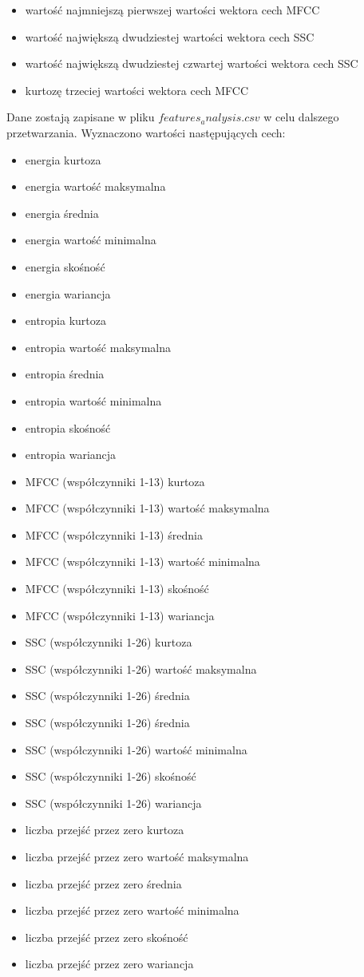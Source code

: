 \documentclass[a4paper,12pt,twoside,openany]{report}
\begin{document}
\begin{itemize}
\item wartość najmniejszą pierwszej wartości wektora cech MFCC
\item wartość największą dwudziestej wartości wektora cech SSC
\item wartość największą dwudziestej czwartej wartości wektora cech SSC
\item kurtozę trzeciej wartości wektora cech MFCC
\end{itemize}
Dane zostają zapisane w pliku $features_analysis.csv$ w celu dalszego przetwarzania.
Wyznaczono wartości następujących cech:
\begin{itemize}
\item energia kurtoza
\item energia wartość maksymalna
\item energia średnia
\item energia wartość minimalna
\item energia skośność
\item energia wariancja
\item entropia kurtoza
\item entropia wartość maksymalna
\item entropia średnia
\item entropia wartość minimalna
\item entropia skośność
\item entropia wariancja
\item MFCC (współczynniki 1-13)  kurtoza
\item MFCC (współczynniki 1-13)  wartość maksymalna
\item MFCC (współczynniki 1-13)  średnia
\item MFCC (współczynniki 1-13)  wartość minimalna
\item MFCC (współczynniki 1-13)  skośność
\item MFCC (współczynniki 1-13)  wariancja
\item SSC (współczynniki 1-26)  kurtoza
\item SSC (współczynniki 1-26)  wartość maksymalna
\item SSC (współczynniki 1-26)  średnia
\item SSC (współczynniki 1-26)  średnia
\item SSC (współczynniki 1-26)  wartość minimalna
\item SSC (współczynniki 1-26)  skośność
\item SSC (współczynniki 1-26)  wariancja
\item liczba przejść przez zero kurtoza
\item liczba przejść przez zero wartość maksymalna
\item liczba przejść przez zero średnia
\item liczba przejść przez zero wartość minimalna
\item liczba przejść przez zero skośność
\item liczba przejść przez zero wariancja
\end{itemize}
\end{document}
